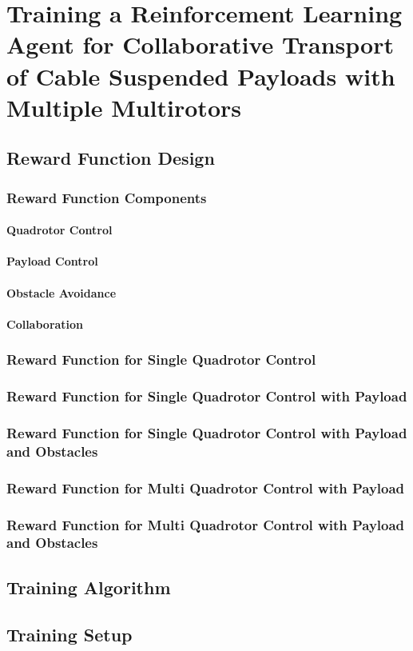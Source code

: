 \chapter{Training a Reinforcement Learning Agent for Collaborative Transport of Cable Suspended Payloads with Multiple Multirotors}
\section{Reward Function Design}
\subsection{Reward Function Components}
\subsubsection{Quadrotor Control}
\subsubsection{Payload Control}
\subsubsection{Obstacle Avoidance}
\subsubsection{Collaboration}
\subsection{Reward Function for Single Quadrotor Control}
\subsection{Reward Function for Single Quadrotor Control with Payload}
\subsection{Reward Function for Single Quadrotor Control with Payload and Obstacles}
\subsection{Reward Function for Multi Quadrotor Control with Payload}
\subsection{Reward Function for Multi Quadrotor Control with Payload and Obstacles}



\section{Training Algorithm}
\section{Training Setup}


